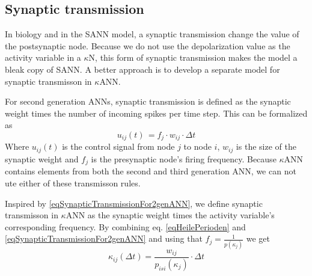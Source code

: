 
	
	\subsection{Synaptic transmission}
	\label{ssecSynTransForANNliggeriKANNsection}

		In biology and in the SANN model, a synaptic transmission change the value of the postsynaptic node.
		Because we do not use the depolarization value as the activity variable in a $\kappa$N, this form of synaptic transmission makes the model a bleak copy of SANN.   %
		A better approach is to develop a separate model for synaptic transmisson in $\kappa$ANN.

		For second generation ANNs, synaptic transmission is defined as the synaptic weight times the number of incoming spikes per time step.
		This can be formalized as
		\begin{equation}
			u_{ij}(t) \, = f_{j} \cdot w_{ij} \cdot \Delta t
			\label{eqSynapticTransmissionFor2genANN}
		\end{equation}
		Where $u_{ij}(t)$ is the control signal from node $j$ to node $i$, $w_{ij}$ is the size of the synaptic weight %
			and $f_j$ is the presynaptic node's firing frequency.
		Because $\kappa$ANN contains elements from both the second and third generation ANN, %
																							 we can not ute either of these transmisson rules.

		Inspired by \eqref{eqSynapticTransmissionFor2genANN}, we define synaptic transmisson in $\kappa$ANN as the synaptic weight times the activity variable's corresponding frequency.
		By combining eq. \eqref{eqHeilePerioden} and \eqref{eqSynapticTransmissionFor2genANN} and using that $f_j = \frac{1}{p(\kappa_j)}$ we get
		\begin{equation}
			\kappa_{ij}(\Delta t) = \frac{ w_{ij} }{ p_{isi}(\kappa_j)} \cdot \Delta t  %
		\end{equation}
 		
